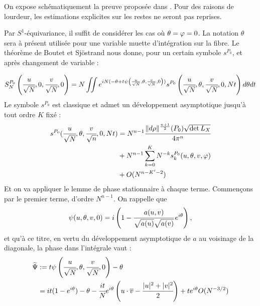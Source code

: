 \begin{preuve}
	On expose schématiquement la preuve proposée dans \cite{Shiffman2002}. Pour des raisons de lourdeur, les estimations explicites sur les restes ne seront pas reprises.
	
	Par $S^1$-équivariance, il suffit de considérer les cas où $\theta = \varphi = 0$. La notation $\theta$ sera à présent utilisée pour une variable muette d'intégration sur la fibre. Le théorème de Boutet et Sj\"ostrand nous donne, pour un certain symbole $s^{P_0}$, et après changement de variable :
	
	\begin{equation*}
	S_N^{P_0}\left(\cfrac{u}{\sqrt{N}},0,\cfrac{v}{\sqrt{N}},0\right) = N \iint e^{iN(-\theta + t\psi\left(\frac{u}{\sqrt{N}},\theta,\frac{v}{\sqrt{N}},0\right))}s^{P_0}\left(\cfrac{u}{\sqrt{N}},\theta, \cfrac{v}{\sqrt{N}},0,Nt\right)d\theta dt
	\end{equation*}
	Le symbole $s^{P_0}$ est classique et admet un développement asymptotique jusqu'à tout ordre $K$ fixé :
	\begin{align*}
		s^{P_0}(\cfrac{u}{\sqrt{N}},\theta,\cfrac{v}{\sqrt{n}},0,Nt)&=N^{n-1}\cfrac{\|d\rho\|^{\frac{n+1}{2}}(P_0)\sqrt{\det{L_X}}}{4\pi^n}\\
		&+ N^{n-1}\sum_{k=0}^{K}N^{-k}s^{P_0}_k(u,\theta,v,\varphi)\\
		&+O(N^{n-K'-2})
	\end{align*}
	Et on va appliquer le lemme de phase stationnaire à chaque terme. Commençons par le premier terme, d'ordre $N^{n-1}$. On rappelle que 
	\begin{equation*}
	\psi(u,\theta,v,0) = i\left(1-\cfrac{a(u,v)}{\sqrt{a(u)}\sqrt{a(v)}}\,e^{i\theta}\right),
	\end{equation*}
	et qu'à ce titre, en vertu du développement asymptotique de $a$ au voisinage de la diagonale, la phase dans l'intégrale vaut :
	\begin{align*}
	\widetilde{\Psi} &:= t\psi\left(\cfrac{u}{\sqrt{N}},\theta,\cfrac{v}{\sqrt{N}},0\right) -\theta\\&= it(1-e^{i\theta}) - \theta - \cfrac{it}{N}e^{i\theta}\left(u\cdot\overline{v} - \cfrac {|u|^2+|v|^2}{2}\right) + t e^{i\theta}O(N^{-3/2})
	\end{align*}
	

\end{preuve}
